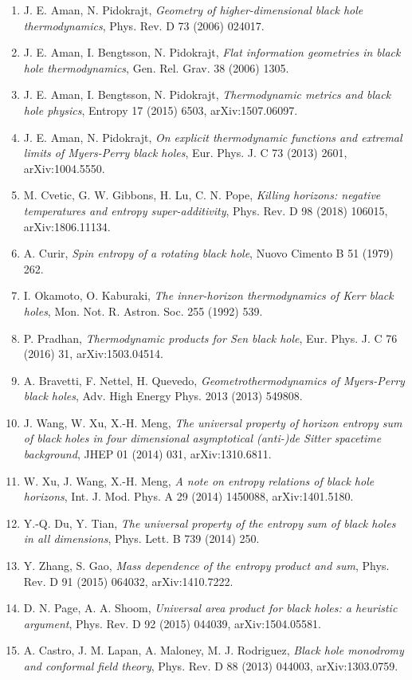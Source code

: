 \documentclass[11pt]{article}
\begin{document}
\begin{enumerate}
\item J. E. Aman, N. Pidokrajt, \emph{Geometry of higher-dimensional black hole thermodynamics}, Phys. Rev. D 73 (2006) 024017.
\item J. E. Aman, I. Bengtsson, N. Pidokrajt, \emph{Flat information geometries in black hole thermodynamics}, Gen. Rel. Grav. 38 (2006) 1305.
\item J. E. Aman, I. Bengtsson, N. Pidokrajt, \emph{Thermodynamic metrics and black hole physics}, Entropy 17 (2015) 6503, arXiv:1507.06097.
\item J. E. Aman, N. Pidokrajt, \emph{On explicit thermodynamic functions and extremal limits of Myers-Perry black holes}, Eur. Phys. J. C 73 (2013) 2601, arXiv:1004.5550.
\item M. Cvetic, G. W. Gibbons, H. Lu, C. N. Pope, \emph{Killing horizons: negative temperatures and entropy super-additivity}, Phys. Rev. D 98 (2018) 106015, arXiv:1806.11134.
\item A. Curir, \emph{Spin entropy of a rotating black hole}, Nuovo Cimento B 51 (1979) 262.
\item I. Okamoto, O. Kaburaki, \emph{The inner-horizon thermodynamics of Kerr black holes}, Mon. Not. R. Astron. Soc. 255 (1992) 539.
\item P. Pradhan, \emph{Thermodynamic products for Sen black hole}, Eur. Phys. J. C 76 (2016) 31, arXiv:1503.04514.
\item A. Bravetti, F. Nettel, H. Quevedo, \emph{Geometrothermodynamics of Myers-Perry black holes}, Adv. High Energy Phys. 2013 (2013) 549808.
\item J. Wang, W. Xu, X.-H. Meng, \emph{The universal property of horizon entropy sum of black holes in four dimensional asymptotical (anti-)de Sitter spacetime background}, JHEP 01 (2014) 031, arXiv:1310.6811.
\item W. Xu, J. Wang, X.-H. Meng, \emph{A note on entropy relations of black hole horizons}, Int. J. Mod. Phys. A 29 (2014) 1450088, arXiv:1401.5180.
\item Y.-Q. Du, Y. Tian, \emph{The universal property of the entropy sum of black holes in all dimensions}, Phys. Lett. B 739 (2014) 250.
\item Y. Zhang, S. Gao, \emph{Mass dependence of the entropy product and sum}, Phys. Rev. D 91 (2015) 064032, arXiv:1410.7222.
\item D. N. Page, A. A. Shoom, \emph{Universal area product for black holes: a heuristic argument}, Phys. Rev. D 92 (2015) 044039, arXiv:1504.05581.
\item A. Castro, J. M. Lapan, A. Maloney, M. J. Rodriguez, \emph{Black hole monodromy and conformal field theory}, Phys. Rev. D 88 (2013) 044003, arXiv:1303.0759.

\end{enumerate}
\end{document}
